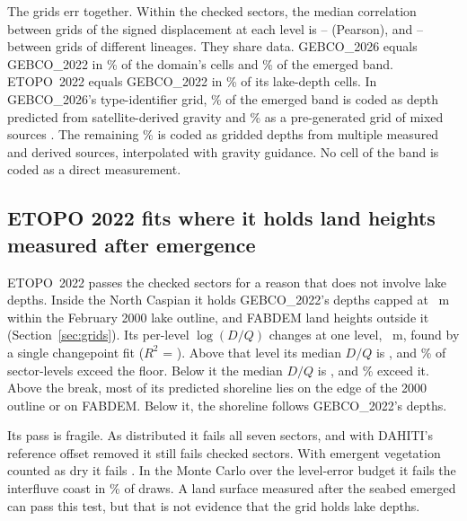 The grids err together. Within the checked sectors, the median correlation between grids of the signed displacement at each level is -- (Pearson), and -- between grids of different lineages. They share data. GEBCO\_2026 equals GEBCO\_2022 in \% of the domain's cells and \% of the emerged band. ETOPO~2022 equals GEBCO\_2022 in \% of its lake-depth cells. In GEBCO\_2026's type-identifier grid, \% of the emerged band is coded as depth predicted from satellite-derived gravity and \% as a pre-generated grid of mixed sources \citep{gebco2026}. The remaining \% is coded as gridded depths from multiple measured and derived sources, interpolated with gravity guidance. No cell of the band is coded as a direct measurement.

\subsection{ETOPO 2022 fits where it holds land heights measured after emergence}
\label{sec:res_etopo}
ETOPO~2022 passes the checked sectors for a reason that does not involve lake depths. Inside the North Caspian it holds GEBCO\_2022's depths capped at ~m within the February 2000 lake outline, and FABDEM land heights outside it (Section~\ref{sec:grids}). Its per-level $\log(D/Q)$ changes at one level, ~m, found by a single changepoint fit ($R^2$ = ). Above that level its median $D/Q$ is , and \% of sector-levels exceed the floor. Below it the median $D/Q$ is , and \% exceed it. Above the break, most of its predicted shoreline lies on the edge of the 2000 outline or on FABDEM. Below it, the shoreline follows GEBCO\_2022's depths.

Its pass is fragile. As distributed it fails all seven sectors, and with DAHITI's reference offset removed it still fails  checked sectors. With emergent vegetation counted as dry it fails . In the Monte Carlo over the level-error budget it fails the interfluve coast in \% of draws. A land surface measured after the seabed emerged can pass this test, but that is not evidence that the grid holds lake depths.

